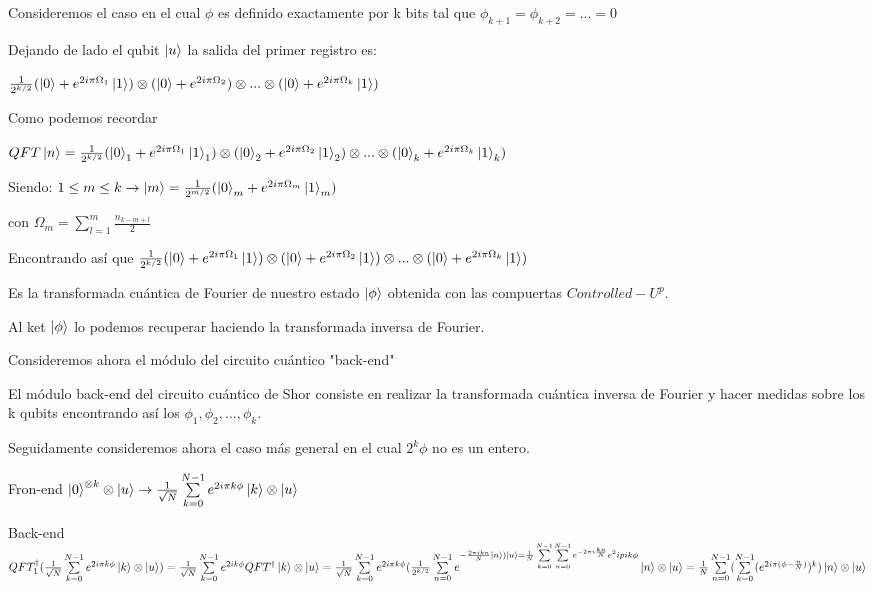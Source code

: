 \documentclass[11pt, spanish]{report}
\begin{document}
Consideremos el caso en el cual $\phi$ es definido exactamente por k bits tal que $\phi_{k+1} = \phi_{k+2} = ... = 0$

Dejando de lado el qubit $\ket{u}$ la salida del primer registro es:

$\frac{1}{2^{k/2}} (\ket{0} + e^{2 i \pi \Omega_1} \ket{1}) \otimes (\ket{0} + e^{2 i \pi \Omega_2}) \otimes ... \otimes (\ket{0} + e^{2 i \pi \Omega_k} \ket{1})$

Como podemos recordar

$QFT \ket{n} = \frac{1}{2^{k/2}} (\ket{0}_1 + e^{2 i \pi \Omega_1} \ket{1}_1) \otimes (\ket{0}_2 +  e^{2 i \pi \Omega_2} \ket{1}_2) \otimes ... \otimes (\ket{0}_k + e^{2 i \pi \Omega_k} \ket{1}_k)$

Siendo: $1 \leq m \leq k \rightarrow \ket{m} = \frac{1}{2^{m/2}} (\ket{0}_m + e^{2 i \pi \Omega_m} \ket{1}_m)$

con $\Omega_m = \sum\limits_{l=1}^m \frac{n_{k-m+l}}{2}$

Encontrando así que $\frac{1}{2^{k/2}} (\ket{0} + e^{2 i \pi \Omega_1} \ket{1}) \otimes (\ket{0} + e^{2 i \pi \Omega_2} \ket{1}) \otimes ... \otimes (\ket{0} + e^{2 i \pi \Omega_k} \ket{1})$

Es la transformada cuántica de Fourier de nuestro estado $\ket{\phi}$ obtenida con las compuertas $Controlled-U^p$.

Al ket $\ket{\phi}$ lo podemos recuperar haciendo la transformada inversa de Fourier.

Consideremos ahora el módulo del circuito cuántico "back-end"


El módulo back-end del circuito cuántico de Shor consiste en realizar la transformada cuántica inversa de Fourier y hacer medidas sobre los k qubits encontrando así los $\phi_1, \phi_2,...,\phi_k$.

Seguidamente consideremos ahora el caso más general en el cual $2^k \phi$ no es un entero.

Fron-end $\ket{0}^{\otimes k} \otimes \ket{u} \rightarrow \frac{1}{\sqrt{N}} \sum\limits_{k=0}^{N-1} e^{2 i \pi k \phi} \ket{k} \otimes \ket{u}$

Back-end $QFT_1^\dagger (\frac{1}{\sqrt{N}} \sum\limits_{k=0}^{N-1} e^{2 i \pi k \phi} \ket{k} \otimes \ket{u}) = \frac{1}{\sqrt{N}} \sum\limits_{k=0}^{N-1} e^{2 i k \phi} QFT^\dagger \ket{k} \otimes \ket{u} = \frac{1}{\sqrt{N}} \sum\limits_{k=0}^{N-1} e^{2 i \pi k \phi} (\frac{1}{2^{k/2}} \sum\limits_{n=0}^{N-1} e^{-\frac{2 \pi i k n}{N} \ket{n}) \ket{u} = \frac{1}{N} \sum\limits_{k=0}^{N-1} \sum\limits_{n=0}^{N-1} e^{- 2 \pi i \frac{k n}{N}} e^2 i pi k \phi} \ket{n} \otimes \ket{u} = \frac{1}{N} \sum\limits_{n=0}^{N-1} (\sum\limits_{k=0}^{N-1} (e^{2 i \pi (\phi - \frac{n}{N})})^k ) \ket{n} \otimes \ket{u}$
\end{document}
